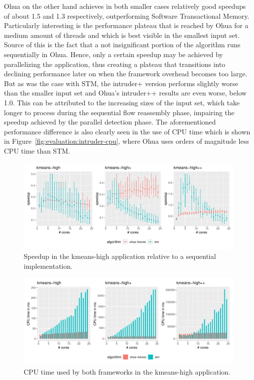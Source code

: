 Ohua on the other hand achieves in both smaller cases relatively good speedups of about 1.5 and 1.3 respectively, outperforming Software Transactional Memory.
Particularly interesting is the performance plateau that is reached by Ohua for a medium amount of threads and which is best visible in the smallest input set.
Source of this is the fact that a not insignificant portion of the algorithm runs sequentially in Ohua.
Hence, only a certain speedup may be achieved by parallelizing the application, thus creating a plateau that transitions into declining performance later on when the framework overhead becomes too large.
But as was the case with STM, the intruder+ version performs slightly worse than the smaller input set and Ohua's intruder++ results are even worse, below 1.0.
This can be attributed to the increasing sizes of the input set, which take longer to process during the sequential flow reassembly phase, impairing the speedup achieved by the parallel detection phase.
The aforementioned performance difference is also clearly seen in the use of CPU time which is shown in Figure~\ref{fig:evaluation:intruder-cpu}, where Ohua uses orders of magnitude less CPU time than STM.


\begin{figure}
    \centering
    \includegraphics[width=\textwidth,keepaspectratio]{gfx/results/kmeans-high_comb}
    \caption{Speedup in the kmeans-high application relative to a sequential implementation.}%
    \label{fig:evaluation:kmeans-high}
\end{figure}

\begin{figure}
    \centering
    \includegraphics[width=\textwidth,keepaspectratio]{gfx/results/cpu_kmeans-high_comb}
    \caption{CPU time used by both frameworks in the kmeans-high application.}%
    \label{fig:evaluation:kmeans-high-cpu}
\end{figure}

